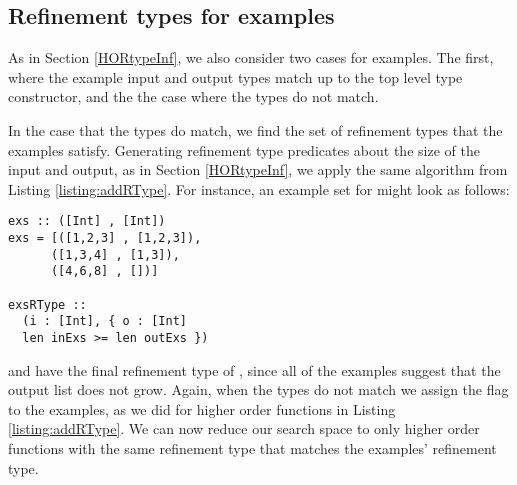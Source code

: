 \subsection{Refinement types for examples}
As in Section \ref{HORtypeInf}, we also consider two cases for examples. The first, where the example input and output types match up to the top level type constructor, and the the case where the types do not match.

In the case that the types do match, we find the set of refinement types that the examples satisfy. Generating refinement type predicates about the size of the input and output, as in Section \ref{HORtypeInf}, we apply the same algorithm from Listing \ref{listing:addRType}. 
For instance, an example set for  might look as follows:

\begin{lstlisting}[caption=Refinement type inference for examples,label=exRTypeGen]
exs :: ([Int] , [Int])
exs = [([1,2,3] , [1,2,3]),
      ([1,3,4] , [1,3]),
      ([4,6,8] , [])]
       
exsRType ::
  (i : [Int], { o : [Int] 
  len inExs >= len outExs })
\end{lstlisting}

\noindent and have the final refinement type of , since all of the examples suggest that the output list does not grow. 
Again, when the types do not match we assign the  flag to the examples, as we did for higher order functions in Listing \ref{listing:addRType}.
We can now reduce our search space to only higher order functions with the same refinement type that matches the examples' refinement type. 
